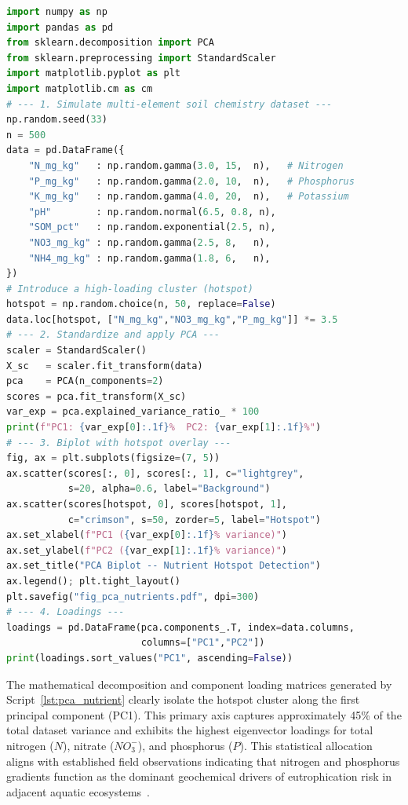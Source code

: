 \documentclass[environremediat,article,accept,pdftex,oneauthor]{Definitions/mdpi}
\begin{document}
\begin{lstlisting}[language=Python,basicstyle=\scriptsize\ttfamily,
    caption={Python %MDPI: Please check and confirm if * should be revised to a multiplication sign.
% AUTHOR: The asterisk is the Python multiplication operator within the code and is correct as written; it should not be revised to a multiplication sign.
 workflow: PCA-based dimensionality reduction and
             nutrient hotspot identification from multi-element soil
             chemistry data (Script~5).\vspace{4pt}},
    label={lst:pca_nutrient},xleftmargin=12pt,xrightmargin=3.5pt]
import numpy as np
import pandas as pd
from sklearn.decomposition import PCA
from sklearn.preprocessing import StandardScaler
import matplotlib.pyplot as plt
import matplotlib.cm as cm
# --- 1. Simulate multi-element soil chemistry dataset ---
np.random.seed(33)
n = 500
data = pd.DataFrame({
    "N_mg_kg"   : np.random.gamma(3.0, 15,  n),   # Nitrogen
    "P_mg_kg"   : np.random.gamma(2.0, 10,  n),   # Phosphorus
    "K_mg_kg"   : np.random.gamma(4.0, 20,  n),   # Potassium
    "pH"        : np.random.normal(6.5, 0.8, n),
    "SOM_pct"   : np.random.exponential(2.5, n),
    "NO3_mg_kg" : np.random.gamma(2.5, 8,   n),
    "NH4_mg_kg" : np.random.gamma(1.8, 6,   n),
})
# Introduce a high-loading cluster (hotspot)
hotspot = np.random.choice(n, 50, replace=False)
data.loc[hotspot, ["N_mg_kg","NO3_mg_kg","P_mg_kg"]] *= 3.5
# --- 2. Standardize and apply PCA ---
scaler = StandardScaler()
X_sc   = scaler.fit_transform(data)
pca    = PCA(n_components=2)
scores = pca.fit_transform(X_sc)
var_exp = pca.explained_variance_ratio_ * 100
print(f"PC1: {var_exp[0]:.1f}%  PC2: {var_exp[1]:.1f}%")
# --- 3. Biplot with hotspot overlay ---
fig, ax = plt.subplots(figsize=(7, 5))
ax.scatter(scores[:, 0], scores[:, 1], c="lightgrey",
           s=20, alpha=0.6, label="Background")
ax.scatter(scores[hotspot, 0], scores[hotspot, 1],
           c="crimson", s=50, zorder=5, label="Hotspot")
ax.set_xlabel(f"PC1 ({var_exp[0]:.1f}% variance)")
ax.set_ylabel(f"PC2 ({var_exp[1]:.1f}% variance)")
ax.set_title("PCA Biplot -- Nutrient Hotspot Detection")
ax.legend(); plt.tight_layout()
plt.savefig("fig_pca_nutrients.pdf", dpi=300)
# --- 4. Loadings ---
loadings = pd.DataFrame(pca.components_.T, index=data.columns,
                        columns=["PC1","PC2"])
print(loadings.sort_values("PC1", ascending=False))
\end{lstlisting}

The mathematical decomposition and component loading matrices generated by Script~\ref{lst:pca_nutrient} clearly isolate the hotspot cluster along the first principal component (PC1). This primary axis captures approximately 45\% of the total dataset variance and exhibits the highest eigenvector loadings for total nitrogen ($N$), nitrate ($NO_3^-$), and phosphorus ($P$). This statistical allocation aligns with established field observations indicating that nitrogen and phosphorus gradients function as the dominant geochemical drivers of eutrophication risk in adjacent aquatic ecosystems~\cite{Guan2024,Xu2025}.
\end{document}
